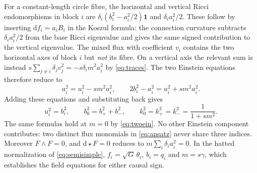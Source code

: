 \documentclass[11pt,a4paper]{article}
\numberwithin{equation}{section}
\newcommand{\dd}{\mathrm{d}}
\begin{document}
For a constant-length circle fibre, the horizontal and vertical Ricci endomorphisms in block $i$ are $\delta_i(b_i^2-a_i^2/2)\mathbf 1$ and $\delta_i a_i^2/2$. These follow by inserting $\dd f_i=a_i B_i$ in the Koszul formula: the connection curvature subtracts $\delta_i a_i^2/2$ from the base Ricci eigenvalue and gives the same signed contribution to the vertical eigenvalue. The mixed flux with coefficient $v_i$ contains the two horizontal axes of block $i$ but \emph{not} its fibre. On a vertical axis the relevant sum is instead $s\sum_{j\ne i}\delta_j v_j^2=-s\delta_i m^2a_i^2$ by \eqref{eq:traces}. The two Einstein equations therefore reduce to
\begin{equation}
 a_i^2=u_i^2-sm^2a_i^2,\qquad 2b_i^2-a_i^2=u_i^2+sm^2a_i^2 .\label{eq:twoein}
\end{equation}
Adding these equations and substituting back gives
\begin{equation}
 u_i^2=b_i^2,\qquad b_0^2=b_+^2+b_-^2,\qquad k_0^2=k_+^2=k_-^2=\frac1{1+sm^2}.\label{eq:locking}
\end{equation}
The same formulas hold at $m=0$ by \eqref{eq:twoein}. No other Einstein component contributes: two distinct flux monomials in \eqref{eq:ansatz} never share three indices. Moreover $F\wedge F=0$, and $\dd\star F=0$ reduces to $m\sum_i\delta_i a_i^2=0$. In the hatted normalization of \eqref{eq:semisimple}, $f_i=\sqrt G\,\theta_i$, $b_i=q_i$ and $m=s\gamma$, which establishes the field equations for either causal sign.
\end{document}

